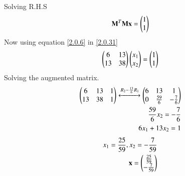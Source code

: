 \documentclass[journal,12pt,twocolumn]{IEEEtran}
\begin{document}
Solving R.H.S
\begin{align}
\mathbf{M}^T\mathbf{M}\mathbf{x} =\begin{pmatrix}1\\1\end{pmatrix}\label{2.0.31}
\end{align}
Now using equation \eqref{2.0.6} in \eqref{2.0.31}
\begin{align}
\begin{pmatrix}6&13\\13&38\end{pmatrix}\begin{pmatrix}x_1\\x_2\end{pmatrix}=\begin{pmatrix}1\\1\end{pmatrix}
\end{align}
Solving the augmented matrix.
\begin{align}
\begin{pmatrix}6&13&1\\13&38&1\end{pmatrix} \xleftrightarrow{R_2-{\frac{13}{6}}R_1}\begin{pmatrix}6&13&1\\0&\frac{59}{6}&-\frac{7}{6}\end{pmatrix}\\
\frac{59}{6}x_2=-\frac{7}{6}\\
6x_1+13x_2=1
\end{align}
\begin{align}
x_1= \frac{25}{59},
x_2=-\frac{7}{59}\\
\mathbf{x}=\begin{pmatrix}\frac{25}{59}\\-\frac{7}{59}\end{pmatrix}
\end{align}

 
\end{document}
